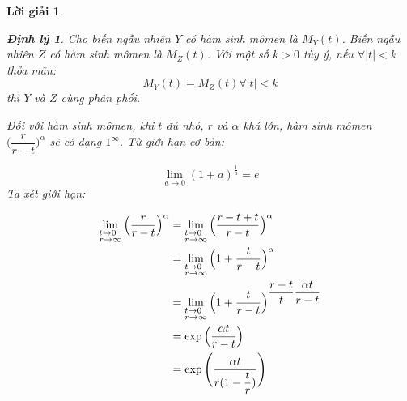 \documentclass[14pt, a4paper]{article}
\newtheorem{dl}{Định lý}
\theoremstyle{sltheorem}
\theoremstyle{soltheorem}
\newtheorem*{loigiai}{Lời giải}
\begin{document}
\begin{loigiai}
\begin{enumerate}
        \begin{dl} \label{dl:1}
            Cho biến ngẫu nhiên $Y$ có hàm sinh mômen là $M_Y(t)$. 
            Biến ngẫu nhiên $Z$ có hàm sinh mômen là $M_Z(t)$.
            Với một số $k > 0$ tùy ý, nếu $\forall \lvert t \rvert < k$ thỏa mãn:
            \begin{equation*}
                M_Y(t) = M_Z(t) \forall \lvert t \vert < k
            \end{equation*}
            thì $Y$ và $Z$ cùng phân phối.
        \end{dl}

        Đối với hàm sinh mômen, khi $t$ đủ nhỏ, $r$ và $\alpha$ khá lớn, hàm sinh mômen $\Big( \dfrac{r}{r-t} \Big)^{\alpha}$ sẽ có dạng $1^{\infty}$.
        Từ giới hạn cơ bản:

        \begin{equation*}
            \lim_{a \rightarrow 0} (1 + a)^{\frac{1}{a}} = e
        \end{equation*}
        Ta xét giới hạn:

        \begin{equation*} 
            \begin{aligned}
                \lim_{\begin{subarray}{l} t \rightarrow 0 \\ r \rightarrow \infty \end{subarray}} \Big( \dfrac{r}{r-t} \Big)^{\alpha} &= \lim_{\begin{subarray}{l} t \rightarrow 0 \\ r \rightarrow \infty \end{subarray}} \Big( \dfrac{r-t + t}{r-t} \Big)^{\alpha} \\
                &= \lim_{\begin{subarray}{l} t \rightarrow 0 \\ r \rightarrow \infty \end{subarray}} \Big(1 + \dfrac{t}{r-t} \Big)^{\alpha} \\
                &= \lim_{\begin{subarray}{l} t \rightarrow 0 \\ r \rightarrow \infty \end{subarray}} \Big(1 + \dfrac{t}{r-t} \Big)^{\dfrac{r-t}{t} \dfrac{\alpha t}{r-t}} \\
                &= \exp\Big(\dfrac{\alpha t}{r-t} \Big) \\
                &= \exp\Bigg(\dfrac{\alpha t}{r(1 - \dfrac{t}{r})} \Bigg)
            \end{aligned}
        \end{equation*}


\end{enumerate}
\end{loigiai}
\end{document}
